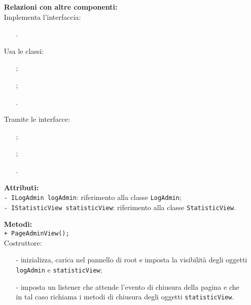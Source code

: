 {\begin{sloppypar}
{{{\begin{itemize}
				\item[]  \textbf{Relazioni con altre componenti:} \\
				Implementa l'interfaccia:
				\begin{itemize}
					\item[] .
				\end{itemize}
				Usa le classi:
				\begin{itemize}
					\item[] ;
					\item[] ;
					\item[] .
				\end{itemize}
				Tramite le interfacce:
				\begin{itemize}
					\item[] ;
					\item[] ;
					\item[] .\\
				\end{itemize}
					
				\item[] \textbf{Attributi:}\\
					\texttt{- ILogAdmin logAdmin}: riferimento alla classe \texttt{LogAdmin};\\
					
					\texttt{- IStatisticView statisticView}: riferimento alla classe \texttt{StatisticView}.\\

				\item[] \textbf{Metodi:}\\
					\texttt{+ PageAdminView();}\\
					Costruttore:
					\begin{itemize}
						\item[-] inizializza, carica nel pannello di root e imposta la visibilità degli oggetti \texttt{logAdmin} e \texttt{statisticView};
						\item[-] imposta un listener che attende l'evento di chiusura della pagina e che in tal caso richiama i metodi di chiusura degli oggetti \texttt{statisticView}.\\
					\end{itemize}
					

\end{itemize}}}}
\end{sloppypar}}
